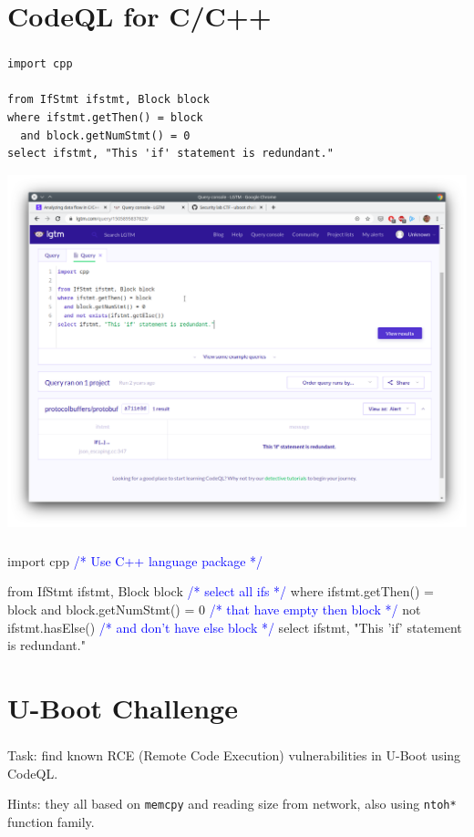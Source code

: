 \documentclass[usenames,dvipsnames]{beamer}
\newcommand{\bluealert}[1] {\alert{\textcolor{blue}{#1}}}
\begin{document}
\section{CodeQL for C/C++}
\begin{frame}[fragile]
\frametitle{\secname}
\small
\begin{verbatim}
import cpp

from IfStmt ifstmt, Block block
where ifstmt.getThen() = block
  and block.getNumStmt() = 0
select ifstmt, "This 'if' statement is redundant."
\end{verbatim}
\end{frame}

\begin{frame}
\includegraphics[scale=0.25]{codeql-example-1.png}
\end{frame}

\begin{frame}[fragile]
\frametitle{\secname}
\small
\begin{semiverbatim}
import cpp		                  \bluealert{/* Use C++ language package */}

from IfStmt ifstmt, Block block \bluealert{/* select all ifs */}
where ifstmt.getThen() = block
  and block.getNumStmt() = 0    \bluealert{/* that have empty then block */}
  not ifstmt.hasElse()		      \bluealert{/* and don't have else block */}
select ifstmt, "This 'if' statement is redundant."
\end{semiverbatim}
\end{frame}

\section{U-Boot Challenge}
\begin{frame}
\frametitle{\secname}
Task: find known RCE (Remote Code Execution) vulnerabilities in U-Boot using CodeQL.

Hints: they all based on \texttt{memcpy} and reading size from network, also using \texttt{ntoh*} function family.
\end{frame}
\end{document}

